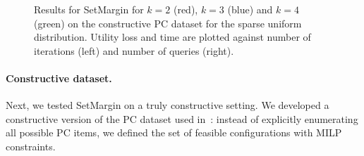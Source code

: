 \documentclass{article}
\renewcommand\[{\begin{equation}}
\renewcommand\]{\end{equation}}
\begin{document}
\begin{figure}
{\begin{tabular}{lcccc}
        \\
    \end{tabular}
    }
    \caption{\label{fig:pc} Results for {\sc SetMargin} for $k=2$
      (red), $k=3$ (blue) and $k=4$ (green) on the constructive PC
      dataset for the sparse uniform distribution. Utility loss and
      time are plotted against number of iterations (left)
      and number of queries (right).}
\end{figure}

\paragraph{Constructive dataset.} Next, we tested {\sc SetMargin} on a truly
constructive setting. We developed a constructive version of the PC dataset
used in~\cite{guo2010real}: instead of explicitly enumerating all possible PC
items, we defined the set of feasible configurations with MILP constraints.
\end{document}
